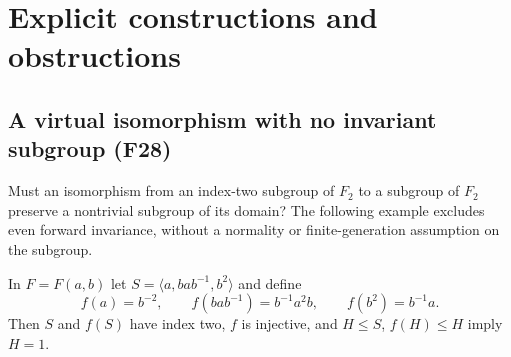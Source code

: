 \section{Explicit constructions and obstructions}\label{sec:explicit}

\subsection{A virtual isomorphism with no invariant subgroup (F28)}\label{sec:f28}
Must an isomorphism from an index-two subgroup of $F_2$ to a subgroup
of $F_2$ preserve a nontrivial subgroup of its domain? The following
example excludes even forward invariance, without a normality or
finite-generation assumption on the subgroup.

\begin{theorem}\label{prop:f28}
In $F=F(a,b)$ let $S=\langle a,bab^{-1},b^2\rangle$ and define
\[
 f(a)=b^{-2},\qquad f(bab^{-1})=b^{-1}a^2b,
 \qquad f(b^2)=b^{-1}a.
\]
Then $S$ and $f(S)$ have index two, $f$ is injective, and
$H\le S$, $f(H)\le H$ imply $H=1$.
\end{theorem}

